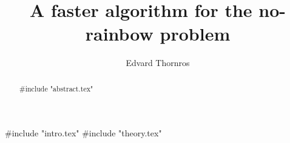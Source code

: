 \documentclass{report}
\title{A faster algorithm for the no-rainbow problem}
\author{Edvard Thornros}
\begin{document}
\maketitle

\begin{abstract}

#include "abstract.tex"

\end{abstract}

#include "intro.tex"
#include "theory.tex"

\printbibliography
\end{document}
